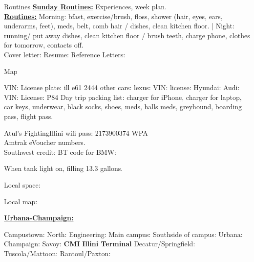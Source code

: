 \documentclass[serif, mathserif, final]{beamer}
\begin{document}
\begin{frame}
  \begin{columns}
    \begin{column}{0.25\linewidth} %
     
      \begin{block}{Routines} 
        \textbf{\underline{Sunday Routines:}} Experiences, week plan. \\ 
        \textbf{\underline{Routines:}} Morning: bfast, exercise/brush, floss, shower (hair, eyes,
        ears, underarms, feet), meds, belt, comb hair / dishes, clean kitchen
        floor. |  Night: running/ put away dishes, clean kitchen floor / brush
        teeth, charge phone, clothes for tomorrow, contacts off. \\
        
        Cover letter: 
        Resume: 
        Reference Letters:  

      \end{block} 
   



\begin{block}{Map} 

        VIN:  License plate: ill e61 2444   other cars: lexus:  VIN:  license:
        Hyundai: 
        Audi: VIN:  License: P84 
        Day trip packing list: charger for iPhone, charger for laptop, car
        keys, underwear, black socks, shoes, meds, halls meds, greyhound,
        boarding pass, flight pass. 
        
        Atul’s FightingIllini  wifi pass:  2173900374 WPA  \\
        Amtrak  eVoucher numbers. \\
        Southwest credit:
        BT code for BMW:
        
        When tank light on, filling 13.3 gallons.



Local space: 

Local map: 

\textbf{\underline{Urbana-Champaign:}}


Campustown: 
  North: Engineering: 
  Main campus: 
  Southside of campus: 
Urbana: 
Champaign: 
Savoy: 
\textbf{CMI} 
\textbf{Illini Terminal} 
Decatur/Springfield: 
Tuscola/Mattoon: 
Rantoul/Paxton: 
\end{block}
  

\end{column}
\end{columns}
\end{frame}
\end{document}
